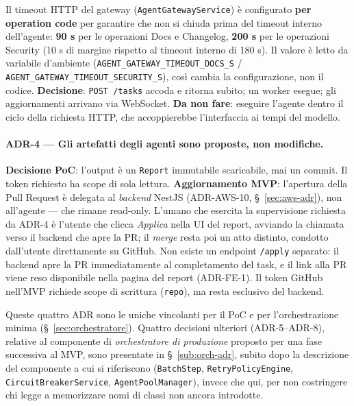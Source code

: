 \documentclass[11pt,a4paper]{article}
\begin{document}
Il timeout HTTP del gateway (\texttt{AgentGatewayService}) è configurato \textbf{per operation code} per garantire che non si chiuda prima del timeout interno dell'agente: \textbf{90 s} per le operazioni Docs e Changelog, \textbf{200 s} per le operazioni Security (10 s di margine rispetto al timeout interno di 180 s). Il valore è letto da variabile d'ambiente (\texttt{AGENT\_GATEWAY\_TIMEOUT\_DOCS\_S} / \texttt{AGENT\_GATEWAY\_TIMEOUT\_SECURITY\_S}), così cambia la configurazione, non il codice. \textbf{Decisione}: \texttt{POST /tasks} accoda e ritorna subito; un worker esegue; gli aggiornamenti arrivano via WebSocket. \textbf{Da non fare}: eseguire l'agente dentro il ciclo della richiesta HTTP, che accoppierebbe l'interfaccia ai tempi del modello.

\paragraph{ADR-4 --- Gli artefatti degli agenti sono proposte, non modifiche.} \textbf{Decisione PoC}: l'output è un \texttt{Report} immutabile scaricabile, mai un commit. Il token richiesto ha scope di sola lettura. \textbf{Aggiornamento MVP}: l'apertura della Pull Request è delegata al \emph{backend} NestJS (ADR-AWS-10, \S~\ref{sec:aws-adr}), non all'agente --- che rimane read-only. L'umano che esercita la supervisione richiesta da ADR-4 è l'utente che clicca \emph{Applica} nella UI del report, avviando la chiamata verso il backend che apre la PR; il \emph{merge} resta poi un atto distinto, condotto dall'utente direttamente su GitHub. Non esiste un endpoint \texttt{/apply} separato: il backend apre la PR immediatamente al completamento del task, e il link alla PR viene reso disponibile nella pagina del report (ADR-FE-1). Il token GitHub nell'MVP richiede scope di scrittura (\texttt{repo}), ma resta esclusivo del backend.

Queste quattro ADR sono le uniche vincolanti per il PoC e per l'orchestrazione minima (\S~\ref{sec:orchestratore}). Quattro decisioni ulteriori (ADR-5--ADR-8), relative al componente di \emph{orchestratore di produzione} proposto per una fase successiva al MVP, sono presentate in \S~\ref{sub:orch-adr}, subito dopo la descrizione del componente a cui si riferiscono (\texttt{BatchStep}, \texttt{RetryPolicy\allowbreak{}Engine}, \texttt{Circuit\allowbreak{}Breaker\allowbreak{}Service}, \texttt{Agent\allowbreak{}Pool\allowbreak{}Manager}), invece che qui, per non costringere chi legge a memorizzare nomi di classi non ancora introdotte.
\end{document}
